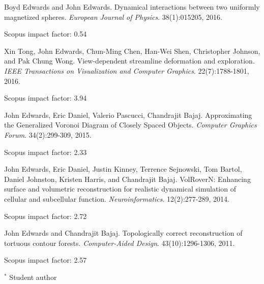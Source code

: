 \documentclass[margin,line]{res}
\newcommand{\pubunder}[1]{#1}
\begin{document}
\begin{resume}
Boyd Edwards and \pubunder{John Edwards}. Dynamical interactions between two uniformly magnetized spheres. \textit{European Journal of Physics}. 38(1):015205, 2016.
\begin{IMPACT}
Scopus impact factor: 0.54 %
\end{IMPACT}

Xin Tong, \pubunder{John Edwards}, Chun-Ming Chen, Han-Wei Shen, Christopher Johnson, and Pak Chung Wong. View-dependent streamline deformation and exploration. \textit{IEEE Transactions on Visualization and Computer Graphics}. 22(7):1788-1801, 2016.
\begin{IMPACT}
Scopus impact factor: 3.94 %
\end{IMPACT}

\pubunder{John Edwards}, Eric Daniel, Valerio Pascucci, Chandrajit Bajaj. Approximating the Generalized Voronoi Diagram of Closely Spaced Objects. \textit{Computer Graphics Forum}. 34(2):299-309, 2015.
\begin{IMPACT}
Scopus impact factor: 2.33 %
\end{IMPACT}

\pubunder{John Edwards}, Eric Daniel, Justin Kinney, Terrence Sejnowski, Tom Bartol, Daniel Johnston, Kristen Harris, and Chandrajit Bajaj. VolRoverN: Enhancing surface and volumetric reconstruction for realistic dynamical simulation of cellular and subcellular function.  \textit{Neuroinformatics}. 12(2):277-289, 2014.
\begin{IMPACT}
Scopus impact factor: 2.72 %
\end{IMPACT}

\protect \pubunder{John Edwards} and Chandrajit Bajaj. Topologically correct reconstruction of tortuous contour forests. \textit{Computer-Aided Design}. 43(10):1296-1306, 2011.
\begin{IMPACT}
Scopus impact factor: 2.57 %
\end{IMPACT}

\begin{IMPACT}
\end{IMPACT}

\begin{footnotesize}$^*$ Student author\end{footnotesize}



\end{resume}
\end{document}

